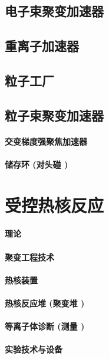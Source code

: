 \documentclass[UTF8]{../../ApplicationUniverse}
\begin{document}
\section{电子束聚变加速器}
\section{重离子加速器}
\section{粒子工厂}
\section{粒子束聚变加速器}
    \subsubsection{交变梯度强聚焦加速器}
    \subsubsection{储存环 (对头碰 )}









\chapter{受控热核反应}
\subsubsection{理论}
\subsubsection{聚变工程技术}
\subsubsection{热核装置}
\subsubsection{热核反应堆 (聚变堆 )}
\subsubsection{等离子体诊断 (测量 )}
\subsubsection{实验技术与设备}
\end{document}
